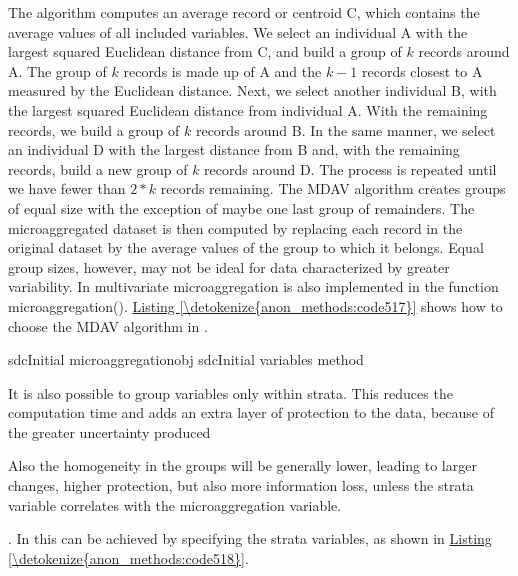 \documentclass[letterpaper,10pt,english]{sphinxmanual}
\begin{document}
The algorithm computes an average record or centroid C, which contains
the average values of all included variables. We select an individual A
with the largest squared Euclidean distance from C, and build a group of
\(k\) records around A. The group of \(k\) records is made up of
A and the \(k-1\) records closest to A measured by the Euclidean
distance. Next, we select another individual B, with the largest squared
Euclidean distance from individual A. With the remaining records, we
build a group of \(k\) records around B. In the same manner, we
select an individual D with the largest distance from B and, with the
remaining records, build a new group of \(k\) records around D. The
process is repeated until we have fewer than \(2*k\) records
remaining. The MDAV algorithm creates groups of equal size with the
exception of maybe one last group of remainders. The microaggregated
dataset is then computed by replacing each record in the original
dataset by the average values of the group to which it belongs. Equal
group sizes, however, may not be ideal for data characterized by greater
variability. In  multivariate microaggregation is also
implemented in the function microaggregation(). \hyperref[\detokenize{anon_methods:code517}]{Listing \ref{\detokenize{anon_methods:code517}}} shows how
to choose the MDAV algorithm in .

\def\sphinxLiteralBlockLabel{\label{\detokenize{anon_methods:code517}}}
%
\begin{sphinxVerbatim}[commandchars=\\\{\},numbers=left,firstnumber=1,stepnumber=1]
sdcInitial  microaggregationobj  sdcInitial
                               variables    
                               method  
\end{sphinxVerbatim}

It is also possible to group variables only within strata. This reduces
the computation time and adds an extra layer of protection to the data,
because of the greater uncertainty produced %
\begin{footnote}[17]\sphinxAtStartFootnote
Also the homogeneity in the groups will be generally lower, leading
to larger changes, higher protection, but also more information loss,
unless the strata variable correlates with the microaggregation
variable.
%
\end{footnote}. In
 this can be achieved by specifying the strata variables, as
shown in \hyperref[\detokenize{anon_methods:code518}]{Listing \ref{\detokenize{anon_methods:code518}}}.
\end{document}
